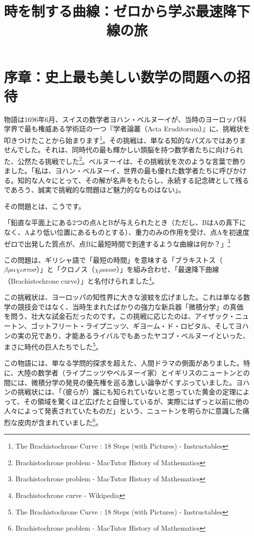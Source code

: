 \documentclass[a4paper,12pt]{bxjsarticle}
\title{\textbf{時を制する曲線：ゼロから学ぶ最速降下線の旅}}
\author{ }
\date{ }
\begin{document}
\maketitle

\section*{序章：史上最も美しい数学の問題への招待}

物語は1696年6月、スイスの数学者ヨハン・ベルヌーイが、当時のヨーロッパ科学界で最も権威ある学術誌の一つ『学者論叢（Acta Eruditorum）』に、挑戦状を叩きつけたことから始まります\footnote{The Brachistochrone Curve : 18 Steps (with Pictures) - Instructables}。その挑戦は、単なる知的なパズルではありませんでした。それは、同時代の最も輝かしい頭脳を持つ数学者たちに向けられた、公然たる挑戦でした\footnote{Brachistochrone problem - MacTutor History of Mathematics}。ベルヌーイは、その挑戦状を次のような言葉で飾りました。「私は、ヨハン・ベルヌーイ、世界の最も優れた数学者たちに呼びかける。知的な人々にとって、その解が名声をもたらし、永続する記念碑として残るであろう、誠実で挑戦的な問題ほど魅力的なものはない」。

その問題とは、こうです。

「鉛直な平面上にある2つの点AとBが与えられたとき（ただし、BはAの真下になく、Aより低い位置にあるものとする）、重力のみの作用を受け、点Aを初速度ゼロで出発した質点が、点Bに最短時間で到達するような曲線は何か？」\footnote{Brachistochrone problem - MacTutor History of Mathematics}

この問題は、ギリシャ語で「最短の時間」を意味する「ブラキストス（$\beta\rho\alpha\chi\iota\sigma\tau o\sigma$）」と「クロノス（$\chi\rho o\nu o\sigma$）」を組み合わせ、「最速降下曲線（Brachistochrone curve）」と名付けられました\footnote{Brachistochrone curve - Wikipedia}。

この挑戦状は、ヨーロッパの知性界に大きな波紋を広げました。これは単なる数学の競技会ではなく、当時生まれたばかりの強力な新兵器「微積分学」の真価を問う、壮大な試金石だったのです。この挑戦に応じたのは、アイザック・ニュートン、ゴットフリート・ライプニッツ、ギヨーム・ド・ロピタル、そしてヨハンの実の兄であり、才能あるライバルでもあったヤコブ・ベルヌーイといった、まさに時代の巨人たちでした\footnote{The Brachistochrone Curve : 18 Steps (with Pictures) - Instructables}。

この物語には、単なる学問的探求を超えた、人間ドラマの側面がありました。特に、大陸の数学者（ライプニッツやベルヌーイ家）とイギリスのニュートンとの間には、微積分学の発見の優先権を巡る激しい論争がくすぶっていました。ヨハンの挑戦状には、「（彼らが）誰にも知られていないと思っていた黄金の定理によって、その領域を驚くほど広げたと自慢しているが、実際にはずっと以前に他の人々によって発表されていたものだ」という、ニュートンを明らかに意識した痛烈な皮肉が含まれていました\footnote{Brachistochrone problem - MacTutor History of Mathematics}。
\end{document}
